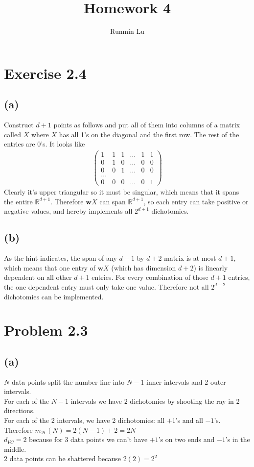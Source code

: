\documentclass{article}
\title{Homework 4}
\author{Runmin Lu}
\begin{document}
	\maketitle
	
	\section*{Exercise 2.4}
	\subsection*{(a)}
		Construct $d+1$ points as follows and put all of them into columns of a matrix called $X$ where $X$ has all 1's on the diagonal and the first row. The rest of the entries are 0's. It looks like
		\begin{align*}
			\begin{pmatrix}
				1 & 1 & 1 & ... & 1 & 1\\
				0 & 1 & 0 & ... & 0 & 0\\
				0 & 0 & 1 & ... & 0 & 0\\
				...\\
				0 & 0 & 0 & ... & 0 & 1
			\end{pmatrix}
		\end{align*}
		Clearly it's upper triangular so it must be singular, which means that it spans the entire $\mathbb R^{d+1}$. Therefore $\mathbf wX$ can span $\mathbb R^{d+1}$, so each entry can take positive or negative values, and hereby implements all $2^{d+1}$ dichotomies.
	
	\subsection*{(b)}
		As the hint indicates, the span of any $d+1$ by $d+2$ matrix is at most $d+1$, which means that one entry of $\mathbf wX$ (which has dimension $d+2$) is linearly dependent on all other $d+1$ entries. For every combination of those $d+1$ entries, the one dependent entry must only take one value. Therefore not all $2^{d+2}$ dichotomies can be implemented.
		
	\section*{Problem 2.3}
	\subsection*{(a)}
		$N$ data points split the number line into $N-1$ inner intervals and 2 outer intervals.\\
		For each of the $N-1$ intervals we have 2 dichotomies by shooting the ray in 2 directions.\\
		For each of the 2 intervals, we have 2 dichotomies: all $+1$'s and all $-1$'s.\\
		Therefore $m_{\mathcal H} (N) = 2(N-1) + 2 = \boxed{2N}$\\
		$d_{VC} = \boxed{2}$ because for 3 data points we can't have $+1$’s on two ends and $-1$’s in the middle.\\
		2 data points can be shattered because $2(2) = 2^2$
		
\end{document}
